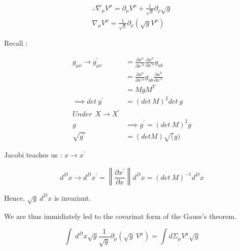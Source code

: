 \documentclass[12pt, letterpaper]{article}
\newcommand*{\1}{\hspace{1pt}}
\begin{document}
        \begin{equation}
            \begin{split}
             \therefore \nabla _{\mu} V^{\mu} = \partial _{\mu} V^{\mu} + \frac{1}{\sqrt{g}} \partial _{\rho}\sqrt{g} \\ 
             \boxed{\nabla _{\mu} V^{\mu} = \frac{1}{\sqrt{g}} \partial _{\rho}\left(\sqrt{g} V^{\mu}\right)}
            \end{split}
        \end{equation}

        Recall : 
        
        \begin{equation}
            \begin{split}
                g_{\mu \nu} \longrightarrow g^{'} _{\mu \nu}  & = \frac{\partial x^{a}}{\partial x^{' \mu}}\frac{\partial x^{b}}{\partial x^{' \nu}} g_{ab} \\ 
                 & = \frac{\partial x^{a}}{\partial x^{' \mu}}g_{ab}\frac{\partial x^{b}}{\partial x^{' \nu}} \\ 
                 & = MgM^{T}\\
                \implies det  \ g^{'} & = \left(det \ M\right) ^{2} det \ g \\
                Under \ \  X \longrightarrow X^{'} \\
                g & \implies  g^{'} = \left(det \ M\right)^{2}g  \\
                \sqrt{g^{'}} &= \left(det M\right) \sqrt(g) 
            \end{split}
        \end{equation}

        Jacobi teaches us : $ x \rightarrow x^{'}$

        \begin{equation}
            d^{D}x \rightarrow d^{D}x^{'} = \left\lVert \frac{\partial x^{'}}{\partial x}\right\rVert d^{D}x = (det \ M) ^{-1} d^{D}x 
        \end{equation}
    
        Hence, $\sqrt{g} \ d^{D}x$ is invariant.

        We are thus immidiately led to the covarinat form of the Gauss's theorem.

        \begin{equation}
            \int_{}^{}  \,d^{D}x \sqrt{g}\frac{1}{\sqrt{g}}\partial _{\mu} \left(\sqrt{g} \ V^{\mu}\right) = \int d \Sigma _{\mu} V^{\mu} \sqrt{g} 
        \end{equation}
\end{document}
